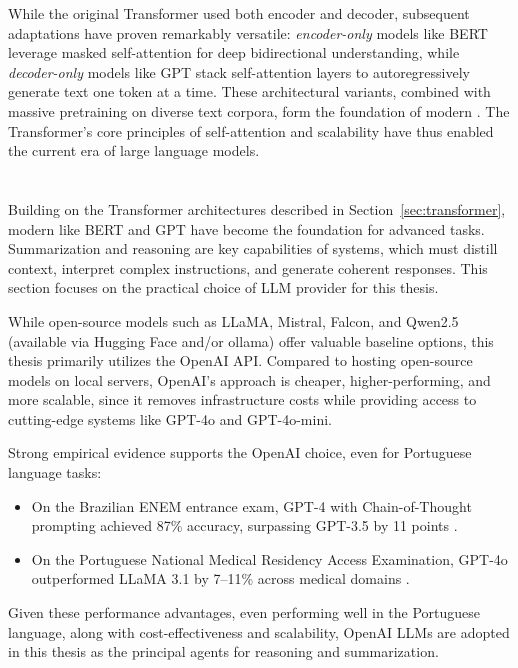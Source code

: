 While the original Transformer used both encoder and decoder, subsequent adaptations have proven remarkably versatile: \textit{encoder-only} models like \gls{BERT} leverage masked self-attention for deep bidirectional understanding, while \textit{decoder-only} models like \gls{GPT} stack self-attention layers to autoregressively generate text one token at a time. These architectural variants, combined with massive pretraining on diverse text corpora, form the foundation of modern . The Transformer's core principles of self-attention and scalability have thus enabled the current era of large language models.

\section{}
\label{sec:llm}
Building on the Transformer architectures described in Section~\ref{sec:transformer}, modern  like \gls{BERT} and \gls{GPT} have become the foundation for advanced  tasks. Summarization and reasoning are key capabilities of  systems, which must distill context, interpret complex instructions, and generate coherent responses. This section focuses on the practical choice of \gls{LLM} provider for this thesis.

While open-source models such as LLaMA, Mistral, Falcon, and Qwen2.5 (available via Hugging Face and/or ollama) offer valuable baseline options, this thesis primarily utilizes the OpenAI API. Compared to hosting open-source models on local servers, OpenAI's approach is cheaper, higher-performing, and more scalable, since it removes infrastructure costs while providing access to cutting-edge systems like \gls{GPT}-4o and \gls{GPT}-4o-mini.

Strong empirical evidence supports the OpenAI choice, even for Portuguese language tasks:
\begin{itemize}
  \item On the Brazilian ENEM entrance exam, \gls{GPT}-4 with Chain-of-Thought prompting achieved 87\% accuracy, surpassing \gls{GPT}-3.5 by 11 points \cite{arxiv2303.17003}.
  \item On the Portuguese National Medical Residency Access Examination, \gls{GPT}-4o outperformed LLaMA 3.1 by 7–11\% across medical domains \cite{pmc12166901}.
\end{itemize}

Given these performance advantages, even performing well in the Portuguese language, along with cost-effectiveness and scalability, OpenAI \glspl{LLM} are adopted in this thesis as the principal agents for reasoning and summarization.


